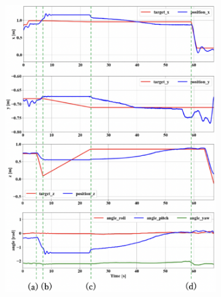 \documentclass{jarticle}
\begin{document}
\begin{figure}[H]
  \centering
  \begin{subfigure}{0.38\columnwidth}
    \includegraphics[width=\textwidth]{figs/plot1.eps}
    \vspace{-6mm}
    \caption{}
    \label{fig:plot1}
  \end{subfigure}
  \begin{subfigure}{0.38\columnwidth}

\end{subfigure}
\end{figure}
\end{document}
